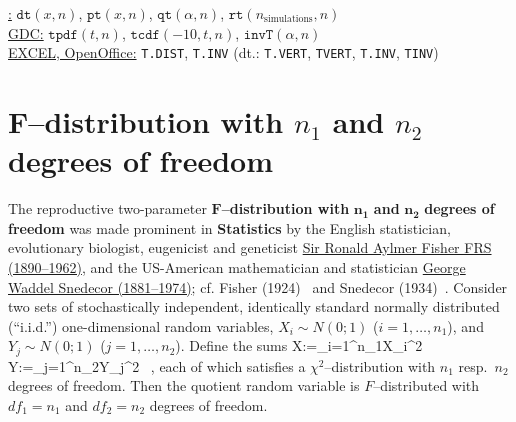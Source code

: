\medskip
\noindent
\underline{\R:} $\texttt{dt}(x,n)$, $\texttt{pt}(x,n)$,
$\texttt{qt}(\alpha,n)$,
$\texttt{rt}(n_{\mathrm{simulations}},n)$ \\
\underline{GDC:} $\texttt{tpdf}(t,n)$, $\texttt{tcdf}(-10,t,n)$,
$\texttt{invT}(\alpha,n)$ \\
\underline{EXCEL, OpenOffice:} \texttt{T.DIST}, \texttt{T.INV}
(dt.: \texttt{T.VERT}, \texttt{TVERT}, \texttt{T.INV},
\texttt{TINV})

\section[$F$--distribution]{$\boldsymbol{F}$--distribution with
$n_{1}$ and $n_{2}$ degrees of freedom}
The reproductive two-parameter
$\boldsymbol{F}$\textbf{--distribution with}
$\boldsymbol{n_{1}}$ \textbf{and} $\boldsymbol{n_{2}}$
\textbf{degrees of freedom} was made prominent in
\textbf{Statistics} by the English statistician, evolutionary
biologist, eugenicist and geneticist
\href{http://www-history.mcs.st-and.ac.uk/Biographies/Fisher.html}{Sir
Ronald Aylmer Fisher FRS (1890--1962)}, and the
US-American mathematician and statistician
\href{http://en.wikipedia.org/wiki/George_W._Snedecor}{George
Waddel Snedecor (1881--1974)}; cf. Fisher (1924)~ and 
Snedecor (1934)~. Consider two sets of stochastically 
independent, identically standard normally distributed 
(``i.i.d.'') one-dimensional random variables, $X_{i} \sim N(0;1)$
($i=1,\ldots,n_{1}$), and $Y_{j} \sim N(0;1)$
($j=1,\ldots,n_{2}$). Define the sums
%
\be
X:=\sum_{i=1}^{n_{1}}X_{i}^{2}
\qquad{}\qquad
Y:=\sum_{j=1}^{n_{2}}Y_{j}^{2} \ ,
\ee
%
each of which satisfies a $\chi^{2}$--distribution with $n_{1}$ 
resp.~$n_{2}$ degrees of freedom. Then the quotient random variable
%
\be
{}
\ee
%
is $F$--distributed with $df_{1}=n_{1}$ and $df_{2}=n_{2}$ degrees 
of freedom.

